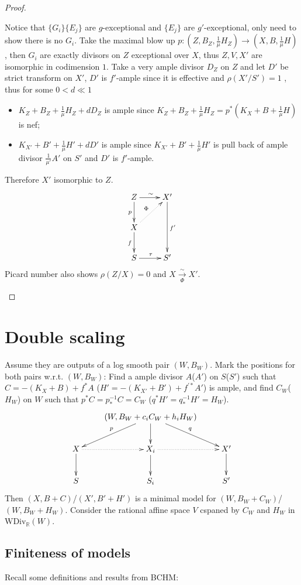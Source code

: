 \documentclass{article}
\begin{document}
\begin{proof}
\begin{enumerate}
Notice that $ \{G_i\} \{E_j\} $ are $ g $-exceptional and $ \{E_j\} $ are $ g' $-exceptional, only need to show there is no $ G_i $. Take the maximal blow up $ p:(Z,B_Z,\frac{1}{\mu} H_Z)\to (X,B,\frac{1}{\mu} H) $, then $ G_i $ are exactly divisors on $ Z $ exceptional over $ X $, thus $ Z,V,X' $ are isomorphic in codimension $ 1 $. Take a very ample divisor $ D_Z $ on $ Z $ and let $ D'  $ be strict transform on $ X' $, $ D' $ is $ f' $-ample since it is effective and $ \rho(X'/S')=1 $ , thus for some $ 0<d\ll1 $
\begin{itemize}
\item $ K_Z+B_Z+\frac{1}{\mu }H_Z+dD_Z $ is ample since $ K_Z+B_Z+\frac{1}{\mu }H_Z=p^*(K_X+B+\frac{1}{\mu }H) $ is nef;
\item $ K_{X'}+B'+\frac{1}{\mu }H'+dD' $ is ample since $ K_{X'}+B'+\frac{1}{\mu }H' $ is pull back of ample divisor $ \frac{1}{\mu'}A' $ on $ S' $ and $ D' $ is $ f' $-ample.
\end{itemize}
Therefore $ X' $ isomorphic to $ Z $.
$$ \xymatrix{
Z\ar[r]^\sim\ar[d]_p&X'\ar[dd]^{f'}\\
X\ar[d]_f\ar@{.>}[ur]^\Phi&\\
S\ar[r]^\tau&S' } $$
Picard number also shows $ \rho(Z/X)=0 $ and $ X\xrightarrow[\Phi]{\sim}X' $.
\end{enumerate}
\end{proof}

\section{Double scaling}
Assume they are outputs of a log smooth pair $ (W,B_W) $. Mark the positions for both pairs w.r.t. $ (W,B_W) $: Find a ample divisor $ A $($ A' $) on $ S $($ S' $) such that $ C=-(K_X+B)+f^*A $ ($ H'=-(K_{X'}+B')+f^{'*}A' $) is ample, and find $ C_W $($ H_W $) on $ W $ such that $ p^*C=p^{-1}_*C=C_W $ ($ q^*H'=q^{-1}_*H'=H_W $).
$$ \xymatrix{
&(W,B_W+c_iC_W+h_iH_W)\ar[d]\ar[ld]_p\ar[rd]^{q}&\\
X\ar[d]\ar@{.>}[r]&X_i\ar@{.>}[r]\ar[d]&X'\ar[d]\\
S&S_i&S'} $$
Then $ (X,B+C) $/$ (X',B'+H') $ is a minimal model for $ (W,B_W+C_W) $/$ (W,B_W+H_W) $.  Consider the rational affine space $ V $ cspaned by $ C_W $ and $ H_W $ in $ \mathrm{WDiv}_\mathbb{R}(W) $.
\subsection{Finiteness of models}
Recall some definitions and results from BCHM:
\end{document}
